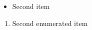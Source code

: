 \documentclass{article}
\begin{document}
\begin{itemize}

    \item Second item
\end{itemize}

\begin{enumerate}

    \item Second enumerated item
\end{enumerate}
\end{document}
